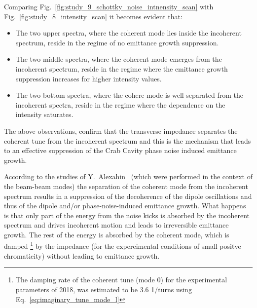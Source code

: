 Comparing Fig.~\ref{fig:study_9_schottky_noise_intnensity_scan} with Fig.~\ref{fig:study_8_intensity_scan} it becomes evident that:
\begin{itemize}
    \item The two upper spectra, where the coherent mode lies inside the incoherent spectrum, reside in the regime of no emittance growth suppression.
    \item The two middle spectra, where the coherent mode emerges from the incoherent spectrum, reside in the regime where the emittance growth suppression increases for higher intensity values.
    \item The two bottom spectra, where the cohere mode is well separated from the incoherent spectra, reside in the regime where the dependence on the intensity saturates.
\end{itemize}

The above observations, confirm that the transverse impedance separates the coherent tune from the incoherent spectrum and this is the mechanism that leads to an effective suppression of the Crab Cavity phase noise induced emittance growth.

According to the studies of Y.~Alexahin~\cite{Alexahin:314169} (which were performed in the context of the beam-beam modes) the separation of the coherent mode from the incoherent spectrum results in a suppression of the decoherence of the dipole oscillations and thus of the dipole and/or phase-noise-induced emittance growth. What happens is that only part of the energy from the noise kicks is absorbed by the incoherent spectrum and drives incoherent motion and leads to irreversible emittance growth. The rest of the energy is absorbed by the coherent mode, which is damped \footnote{The damping rate of the coherent tune (mode 0) for the experimental parameters of 2018, was estimated to be 3.6 1/turns using Eq.~\eqref{eq:imaginary_tune_mode_l}} by the impedance (for the expereimental conditions of small positve chromaticity) without leading to emittance growth.




